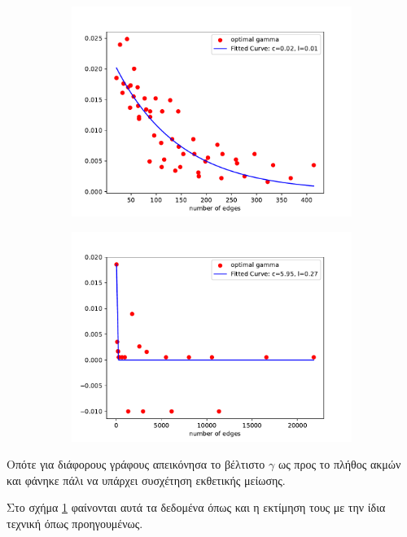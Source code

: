 \documentclass[12pt, letterpaper]{article}
\begin{document}
\begin{figure}
  \centering
  \begin{subfigure}{0.48\textwidth}
    \centering
    \includegraphics[width=0.9\linewidth]{EDGES_GAMMA_FIT.pdf}
    \caption{}
    \label{EDGESFIT}
  \end{subfigure}
  \begin{subfigure}{0.48\textwidth}
    \centering
    \includegraphics[width=0.9\linewidth]{EDGES_GAMMA_FIT_noise.pdf}
    \caption{}
    \label{EDGESFIT_noise}
  \end{subfigure}
\end{figure}

Οπότε για διάφορους γράφους απεικόνησα το βέλτιστο $\gamma$ ως προς το πλήθος ακμών και 
φάνηκε πάλι να υπάρχει συσχέτηση εκθετικής μείωσης. 

Στο σχήμα \ref{EDGESFIT} φαίνονται αυτά τα δεδομένα όπως και η εκτίμηση τους με την 
ίδια τεχνική όπως προηγουμένως. 
\end{document}
